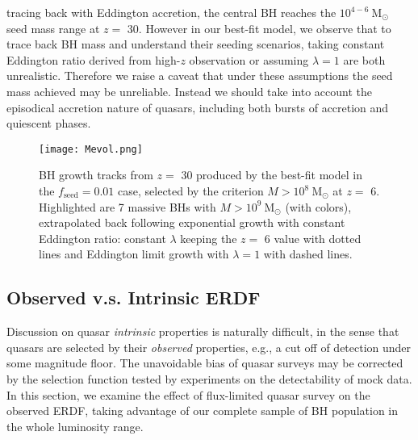 \documentclass[nolinenumbers,preprint2,tighten]{aastex631}
\newcommand{\Msun}{\mathrm{M_\odot}}
\newcommand{\tlife}{t_\mathrm{life}}
\newcommand{\fseed}{f_\mathrm{seed}}
\begin{document}
\begin{CJK*}{UTF8}{gbsn}
tracing back with Eddington accretion, the central BH reaches the $10^{4-6}~\Msun$ seed mass range at $z=$ 30. 
However in our best-fit model, we observe that to trace back BH mass and understand their seeding scenarios, 
taking constant Eddington ratio derived from high-$z$ observation or assuming $\lambda=1$ are both unrealistic. 
Therefore we raise a caveat that under these assumptions the seed mass achieved may be unreliable. 
Instead we should take into account the episodical accretion nature of quasars, 
including both bursts of accretion and quiescent phases.

\begin{figure}
\centering
\texttt{[image: Mevol.png]}
\caption{
BH growth tracks from $z=$ 30 produced by the best-fit model in the $\fseed=0.01$ case, 
selected by the criterion $M>10^8~\Msun$ at $z=$ 6. 
Highlighted are 7 massive BHs with $M>10^9~\Msun$ (with colors), 
extrapolated back following exponential growth with constant Eddington ratio: 
constant $\lambda$ keeping the $z=$ 6 value with dotted lines and 
Eddington limit growth with $\lambda=1$ with dashed lines.
}
\label{fig:track}
\end{figure}

\vspace{2mm}
\subsection{Observed v.s. Intrinsic ERDF}\label{sec:ldist}
Discussion on quasar \textit{intrinsic} properties is naturally difficult, 
in the sense that quasars are selected by their \textit{observed} properties, 
e.g., a cut off of detection under some magnitude floor. 
The unavoidable bias of quasar surveys may be corrected by the selection function tested 
by experiments on the detectability of mock data.
In this section, we examine the effect of flux-limited quasar survey on the observed ERDF, 
taking advantage of our complete sample of BH population in the whole luminosity range. 


\end{CJK*}
\end{document}
